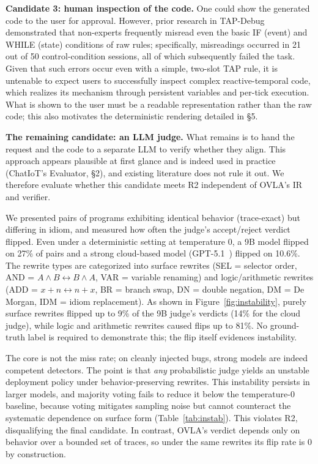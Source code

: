 \documentclass[sigconf,nonacm,anonymous,review]{acmart}
\begin{document}
\textbf{Candidate 3: human inspection of the code.} One could show the generated code to the user for approval. However, prior research in TAP-Debug~\cite{tapdebug} demonstrated that non-experts frequently misread even the basic IF (event) and WHILE (state) conditions of raw rules; specifically, misreadings occurred in 21 out of 50 control-condition sessions, all of which subsequently failed the task. Given that such errors occur even with a simple, two-slot TAP rule, it is untenable to expect users to successfully inspect complex reactive-temporal code, which realizes its mechanism through persistent variables and per-tick execution. What is shown to the user must be a readable representation rather than the raw code; this also motivates the deterministic rendering detailed in \S5.

\textbf{The remaining candidate: an LLM judge.} What remains is to hand the request and the code to a separate LLM to verify whether they align. This approach appears plausible at first glance and is indeed used in practice (ChatIoT's Evaluator, \S2), and existing literature does not rule it out. We therefore evaluate whether this candidate meets R2 independent of OVLA's IR and verifier.

We presented pairs of programs exhibiting identical behavior (trace-exact) but differing in idiom, and measured how often the judge's accept/reject verdict flipped. Even under a deterministic setting at temperature 0, a 9B model flipped on 27\% of pairs and a strong cloud-based model (GPT-5.1~\cite{gpt51}) flipped on 10.6\%. The rewrite types are categorized into surface rewrites (SEL = selector order, AND = $A{\wedge}B{\leftrightarrow}B{\wedge}A$, VAR = variable renaming) and logic/arithmetic rewrites (ADD = $x{+}n{\leftrightarrow}n{+}x$, BR = branch swap, DN = double negation, DM = De Morgan, IDM = idiom replacement). As shown in Figure~\ref{fig:instability}, purely surface rewrites flipped up to 9\% of the 9B judge's verdicts (14\% for the cloud judge), while logic and arithmetic rewrites caused flips up to 81\%. No ground-truth label is required to demonstrate this; the flip itself evidences instability.

The core is not the miss rate; on cleanly injected bugs, strong models are indeed competent detectors. The point is that \emph{any} probabilistic judge yields an unstable deployment policy under behavior-preserving rewrites. This instability persists in larger models, and majority voting fails to reduce it below the temperature-0 baseline, because voting mitigates sampling noise but cannot counteract the systematic dependence on surface form (Table~\ref{tab:instab}). This violates R2, disqualifying the final candidate. In contrast, OVLA's verdict depends only on behavior over a bounded set of traces, so under the same rewrites its flip rate is 0 by construction.
\end{document}
